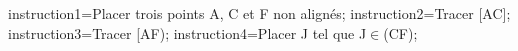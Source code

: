 \documentclass[exercice]{thedocument}%
\begin{document}
%
    \>instruction1={Placer trois points A, C et F non alignés};%
    \>instruction2={Tracer [AC]};%
    \>instruction3={Tracer [AF)};%
    \>instruction4={Placer J tel que J$\in$(CF)};%
\end{document}
